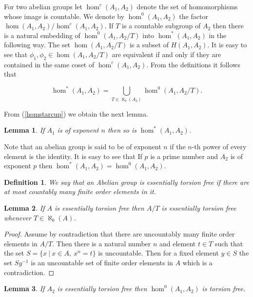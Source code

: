 \documentclass [11pt] {article}
\newtheorem{lemma}{Lemma}[section]
\newtheorem{definition}{Definition}[section]
\begin{document}
For two abelian groups let $\hom^c(A_1,A_2)$ denote the set of homomorphisms whose image is countable. We denote by $\hom^0(A_1,A_2)$ the factor $\hom(A_1,A_2)/\hom^c(A_1,A_2)$. If $T$ is a countable subgroup of $A_2$ then there is a natural embedding of $\hom^0(A_1,A_2/T)$ into $\hom^*(A_1,A_2)$ in the following way.
The set $\hom(A_1,A_2/T)$ is a subset of $H(A_1,A_2)$. It is easy to see that $\phi_1,\phi_2\in\hom(A_1,A_2/T)$ are equivalent if and only if they are contained in the same coset of $\hom^c(A_1,A_2)$. From the definitions it follows that

\begin{equation}\label{homstarcup} \hom^*(A_1,A_2)=\bigcup_{T\in\aleph_0(A_2)} \hom^0(A_1,A_2/T).
\end{equation}

From (\ref{homstarcup}) we obtain the next lemma.

\begin{lemma}\label{exp} If $A_1$ is of exponent $n$ then so is $\hom^*(A_1,A_2)$.
\end{lemma}

Note that an abelian group is said to be of exponent $n$ if the $n$-th power of every element is the identity.
It is easy to see that If $p$ is a prime number and $A_2$ is of exponent $p$ then $\hom^*(A_1,A_2)=\hom^0(A_1,A_2)$.

\begin{definition} We say that an Abelian group is essentially torsion free if there are at most countably many finite order elements in it.
\end{definition}

\begin{lemma}\label{estors} If $A$ is essentially torsion free then $A/T$ is essentially torsion free whenever $T\in\aleph_0(A)$.
\end{lemma}

\begin{proof} Assume by contradiction that there are uncountably many finite order elements in $A/T$. Then there is a natural number $n$ and element $t\in T$ such that the set
$S=\{x~|~x\in A,~x^n=t\}$ is uncountable. Then for a fixed element $y\in S$ the set $Sy^{-1}$ is an uncountable set of finite order elements in $A$ which is a contradiction.
\end{proof}

\begin{lemma}\label{nullfree} If $A_2$ is essentially torsion free then $\hom^0(A_1,A_2)$ is torsion free.
\end{lemma}
\end{document}

